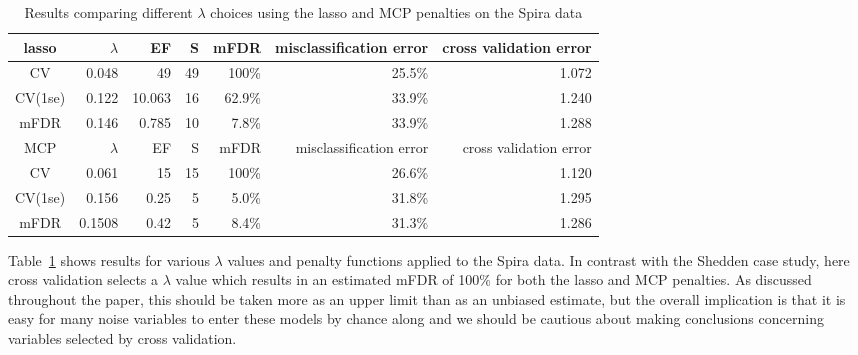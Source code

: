 
\begin{table}[htb!]
\centering
\begin{tabular}{c | r r r r r r }
  \hline
lasso & $\lambda$ & EF & S & mFDR & misclassification error & cross validation error \\ 
	\hline
	CV & 0.048 & 49 & 49 & 100\% & 25.5\% & 1.072 \\
	CV(1se) & 0.122 & 10.063 & 16 & 62.9\% & 33.9\% & 1.240 \\
	mFDR & 0.146 & 0.785 & 10 & 7.8\% &  33.9\% & 1.288 \\
\hline
MCP & $\lambda$ & EF & S & mFDR & misclassification error & cross validation error \\
	\hline
	CV & 0.061 & 15 & 15 & 100\% & 26.6\% & 1.120 \\
	CV(1se) & 0.156 & 0.25 & 5 & 5.0\% & 31.8\% & 1.295 \\
	mFDR & 0.1508 & 0.42 & 5 & 8.4\% &  31.3\% & 1.286 \\
		\hline
\end{tabular}
\caption{\label{Tab:spira} Results comparing different $\lambda$ choices using the lasso and MCP penalties on the Spira data }
\end{table}

Table~\ref{Tab:spira} shows results for various $\lambda$ values and penalty functions applied to the Spira data.  In contrast with the Shedden case study, here cross validation selects a $\lambda$ value which results in an estimated mFDR of 100\% for both the lasso and MCP penalties.  As discussed throughout the paper, this should be taken more as an upper limit than as an unbiased estimate, but the overall implication is that it is easy for many noise variables to enter these models by chance along and we should be cautious about making conclusions concerning variables selected by cross validation.


